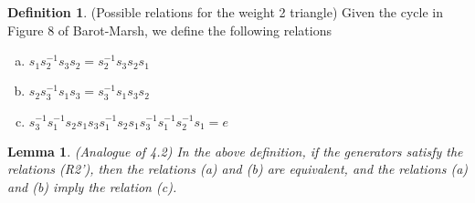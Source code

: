 \documentclass[11pt]{amsart}
\newtheorem{lem}[thm]{Lemma}
\theoremstyle{definition}
\newtheorem{defn}[thm]{Definition}
\begin{document}
\begin{defn} (Possible relations for the weight 2 triangle) Given the cycle in Figure 8 of Barot-Marsh, we define the following relations
\begin{enumerate}[(a)]
\item $s_{1}s_{2}^{-1}s_{3}s_{2} = s_{2}^{-1}s_{3}s_{2}s_{1}$
\item $s_{2}s_{3}^{-1}s_{1}s_{3} = s_{3}^{-1}s_{1}s_{3}s_{2}$
\item $s_{3}^{-1}s_{1}^{-1}s_{2}s_{1}s_{3}s_{1}^{-1}s_{2}s_{1}s_{3}^{-1}s_{1}^{-1}s_{2}^{-1}s_{1} = e$
\end{enumerate}
\end{defn}

\begin{lem} (Analogue of 4.2)
In the above definition, if the generators satisfy the relations (R2'), then the relations (a) and (b) are equivalent, and the relations (a) and (b) imply the relation (c).
\end{lem}
\end{document}
